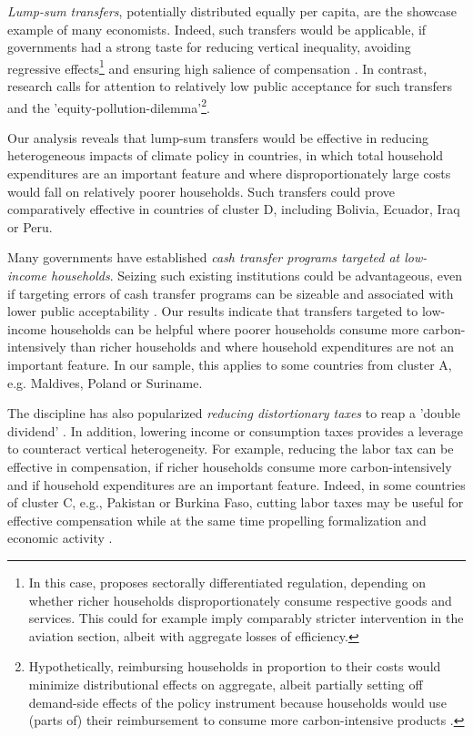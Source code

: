 \documentclass[12pt, a4paper]{article}
\begin{document}
\textit{Lump-sum transfers}, potentially distributed equally per capita, are the showcase example of many economists. Indeed, such transfers would be applicable, if governments had a strong taste for reducing vertical inequality, avoiding regressive effects\footnote{In this case, \textcite{Stiglitz.2019} proposes sectorally differentiated regulation, depending on whether richer households disproportionately consume respective goods and services. This could for example imply comparably stricter intervention in the aviation section, albeit with aggregate losses of efficiency.} and ensuring high salience of compensation \autocite{Chetty.2009}. In contrast, research calls for attention to relatively low public acceptance for such transfers and the 'equity-pollution-dilemma'\footnote{Hypothetically, reimbursing households in proportion to their costs would minimize distributional effects on aggregate, albeit partially setting off demand-side effects of the policy instrument because households would use (parts of) their reimbursement to consume more carbon-intensive products \autocite[see also][]{Stiglitz.2019}.}\autocite{Sager.2019}.

Our analysis reveals that lump-sum transfers would be effective in reducing heterogeneous impacts of climate policy in countries, in which total household expenditures are an important feature and where disproportionately large costs would fall on relatively poorer households. Such transfers could prove comparatively effective in countries of cluster D, including Bolivia, Ecuador, Iraq or Peru. %

Many governments have established \textit{cash transfer programs targeted at low-income households}. Seizing such existing institutions could be advantageous, even if targeting errors of cash transfer programs can be sizeable \autocite{Banerjee.2022} and associated with lower public acceptability \autocite{Bah.2019}. Our results indicate that transfers targeted to low-income households can be helpful where poorer households consume more carbon-intensively than richer households and where household expenditures are not an important feature. In our sample, this applies to some countries from cluster A, e.g. Maldives, Poland or Suriname.

The discipline has also popularized \textit{reducing distortionary taxes} to reap a 'double dividend' \autocite{Bovenberg.1996}. In addition, lowering income or consumption taxes provides a leverage to counteract vertical heterogeneity. For example, reducing the labor tax can be effective in compensation, if richer households consume more carbon-intensively and if household expenditures are an important feature. Indeed, in some countries of cluster C, e.g., Pakistan or Burkina Faso, cutting labor taxes may be useful for effective compensation while at the same time propelling formalization \autocite{Jessen.2021,Rocha.2018} and economic activity \autocite{Ulyssea.2018}.
\end{document}
